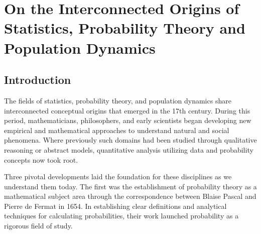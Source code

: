 \chapter{On the Interconnected Origins of Statistics, Probability Theory and Population Dynamics}
\label{ch:07} 



\vspace{1cm}

\section{Introduction}

The fields of statistics, probability theory, and population dynamics share interconnected conceptual origins that emerged in the 17th century. During this period, mathematicians, philosophers, and early scientists began developing new empirical and mathematical approaches to understand natural and social phenomena. Where previously such domains had been studied through qualitative reasoning or abstract models, quantitative analysis utilizing data and probability concepts now took root.

Three pivotal developments laid the foundation for these disciplines as we understand them today. The first was the establishment of probability theory as a mathematical subject area through the correspondence between Blaise Pascal and Pierre de Fermat in 1654. In establishing clear definitions and analytical techniques for calculating probabilities, their work launched probability as a rigorous field of study.

